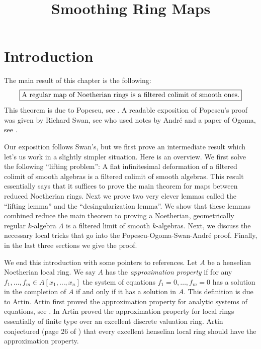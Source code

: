 

%


\title{Smoothing Ring Maps}


\maketitle

\label{section-phantom}

\tableofcontents

\section{Introduction}
\label{section-introduction}

\noindent
The main result of this chapter is the following:
$$
\fbox{A regular map of Noetherian rings is a filtered colimit
of smooth ones.}
$$
This theorem is due to Popescu, see \cite{popescu-letter}.
A readable exposition of Popescu's proof was given by Richard Swan,
see \cite{swan} who used notes by Andr\'e and a paper of Ogoma, see
\cite{Ogoma}.

\medskip\noindent
Our exposition follows Swan's, but we first prove an intermediate result
which let's us work in a slightly simpler situation. Here is an overview.
We first solve the following ``lifting problem'': A flat infinitesimal
deformation of a filtered colimit of smooth algebras is a filtered colimit
of smooth algebras. This result essentially says that it suffices to prove
the main theorem for maps between reduced Noetherian rings. Next we prove
two very clever lemmas called the ``lifting lemma'' and the
``desingularization lemma''. We show that these lemmas combined
reduce the main theorem to proving a Noetherian, geometrically regular
$k$-algebra $\Lambda$ is a filtered limit of smooth $k$-algebras.
Next, we discuss the necessary local tricks that go into the
Popescu-Ogoma-Swan-Andr\'e proof. Finally, in the last three sections
we give the proof.

\medskip\noindent
We end this introduction with some pointers to references.
Let $A$ be a henselian Noetherian local ring.
We say $A$ has the {\it approximation property} if for any
$f_1, \ldots, f_m \in A[x_1, \ldots, x_n]$ the system of equations
$f_1 = 0, \ldots, f_m = 0$ has a solution in the completion
of $A$ if and only if it has a solution in $A$. This definition
is due to Artin.
Artin first proved the approximation property for analytic systems of
equations, see \cite{Artin-Analytic-Approximation}.
In \cite{Artin-Algebraic-Approximation} Artin proved the
approximation property for local rings
essentially of finite type over an excellent discrete valuation ring.
Artin conjectured (page 26 of \cite{Artin-Algebraic-Approximation})
that every excellent henselian local ring should have the
approximation property.

